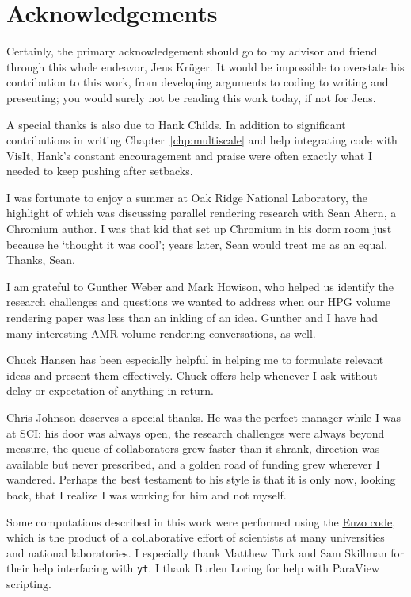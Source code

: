 \section*{Acknowledgements}

Certainly, the primary acknowledgement should go to my advisor and
friend through this whole endeavor, Jens Kr\"uger.  It would be
impossible to overstate his contribution to this work, from developing
arguments to coding to writing and presenting; you would surely not be
reading this work today, if not for Jens.

A special thanks is also due to Hank Childs.  In addition to
significant contributions in writing Chapter~\ref{chp:multiscale} and
help integrating code with VisIt, Hank's constant encouragement and
praise were often exactly what I needed to keep pushing after setbacks.

I was fortunate to enjoy a summer at Oak Ridge National Laboratory,
the highlight of which was discussing parallel rendering research with
Sean Ahern, a Chromium author.  I was that kid that set up Chromium in
his dorm room just because he `thought it was cool'; years later, Sean
would treat me as an equal.  Thanks, Sean.

I am grateful to Gunther Weber and Mark Howison, who helped us identify
the research challenges and questions we wanted to address when our HPG
volume rendering paper was less than an inkling of an idea.  Gunther
and I have had many interesting AMR volume rendering conversations, as
well.

Chuck Hansen has been especially helpful in helping me to formulate
relevant ideas and present them effectively.  Chuck offers help
whenever I ask without delay or expectation of anything in return.

Chris Johnson deserves a special thanks.  He was the perfect manager
while I was at SCI: his door was always open, the research challenges
were always beyond measure, the queue of collaborators grew faster than
it shrank, direction was available but never prescribed, and a golden
road of funding grew wherever I wandered.  Perhaps the best testament
to his style is that it is only now, looking back, that I realize I was
working for him and not myself.

Some computations described in this work were performed using the
\href{http://enzo-project.org}{Enzo code}, which is the product of a
collaborative effort of scientists at many universities and national
laboratories.  I especially thank Matthew Turk and Sam Skillman for
their help interfacing with \texttt{yt}.  I thank Burlen Loring for
help with ParaView scripting.

